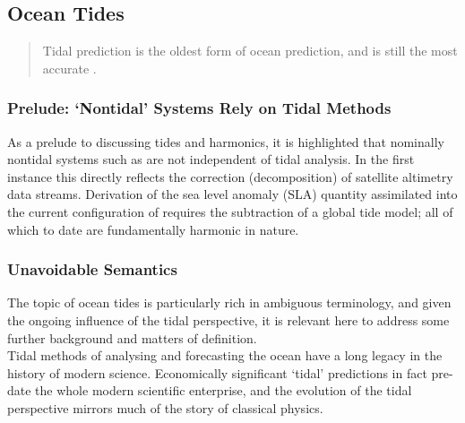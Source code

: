 \subsection{Ocean Tides}
\label{S:TIDE}

\begin{quote}
Tidal prediction is the oldest form of ocean prediction, and is still the most accurate \citep{Parker:2007wq}. 
\end{quote}

\subsubsection{Prelude: `Nontidal' Systems Rely on Tidal Methods}
As a prelude to discussing tides and harmonics, it is highlighted that nominally nontidal systems such as \BL{} are not independent of tidal analysis. In the first instance this directly reflects the correction (decomposition) of satellite altimetry data streams.   Derivation of the sea level anomaly (SLA) quantity assimilated into the current configuration of \BL{} requires the subtraction of a global tide model; all of which to date are fundamentally harmonic in nature. 


\subsubsection{Unavoidable Semantics}
\label{SS:semantics}
The topic of ocean tides is particularly rich in ambiguous terminology, and given the ongoing influence of the tidal perspective, it is relevant here to address some further background and matters of definition.\\ 
Tidal methods of analysing and forecasting the ocean have a long legacy in the history of modern science.  Economically significant `tidal' predictions in fact pre-date the whole modern scientific enterprise, and the evolution of the tidal perspective mirrors much of the story of classical physics.\\


